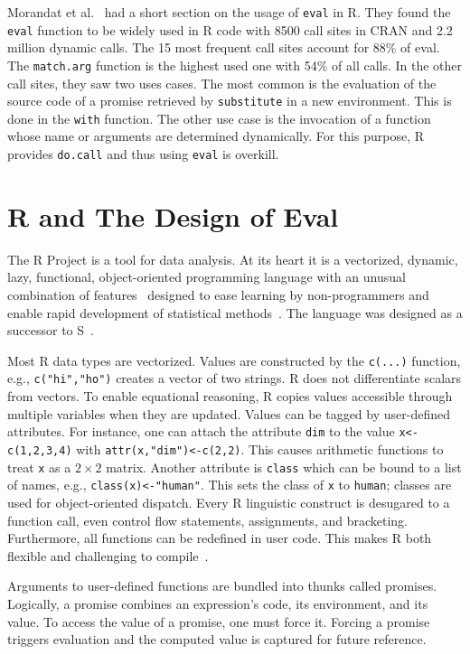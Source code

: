 \documentclass[USenglish,cleveref, autoref, thm-restate]{lipics-v2019}
\newcommand{\eval}{\texttt{eval}\xspace}
\renewcommand{\c}[1]{\lstinline{#1}\xspace}
\begin{document}
Morandat et al.~\cite{ecoop12} had a short section on the usage of \eval in
R. They found the \eval function to be widely used in R code with 8500 call
sites in CRAN and 2.2 million dynamic calls. The 15 most frequent call sites
account for 88\% of eval. The \c{match.arg} function is the highest used one
with 54\% of all calls. In the other call sites, they saw two uses
cases. The most common is the evaluation of the source code of a promise
retrieved by \c{substitute} in a new environment. This is done in the
\c{with} function. The other use case is the invocation of a function whose
name or arguments are determined dynamically. For this purpose, R provides
\c{do.call} and thus using \eval is overkill.

\section{R and The Design of Eval}

The R Project is a tool for data analysis.  At its heart it is a {vectorized,
  dynamic, lazy, functional, object-oriented} programming language with an
unusual combination of features~\cite{ecoop12} designed to ease learning by
non-programmers and enable rapid development of statistical
methods~\cite{R96}.  The language was designed as a successor to
S~\cite{S88}.



Most R data types are vectorized. Values are constructed by the \c{c(...)}
function, e.g., \c{c("hi","ho")} creates a vector of two strings.  R does
not differentiate scalars from vectors. To enable equational reasoning, R
copies values accessible through multiple variables when they are updated.
Values can be tagged by user-defined attributes. For instance, one can
attach the attribute \c{dim} to the value \c{x<-c(1,2,3,4)} with
\c{attr(x,"dim")<-c(2,2)}.  This causes arithmetic functions to treat \c x
as a $2 \times 2$ matrix. Another attribute is \c{class} which can be bound to a list
of names, e.g., \c{class(x)<-"human"}. This sets the class of \c{x} to
\c{human}; classes are used for object-oriented dispatch.  Every R
linguistic construct is desugared to a function call, even control flow
statements, assignments, and bracketing. Furthermore, all functions can be
redefined in user code. This makes R both flexible and challenging to
compile~\cite{dls19}.

Arguments to user-defined functions are bundled into thunks called
promises. Logically, a promise combines an expression's code, its
environment, and its value.  To access the value of a promise, one must
force it. Forcing a promise triggers evaluation and the computed value is
captured for future reference.
\end{document}
